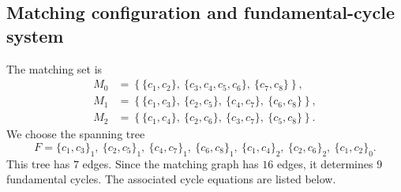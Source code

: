 \documentclass[11pt]{article}
\begin{document}
\subsection{Matching configuration and fundamental-cycle system}
The matching set is
\[
\begin{aligned}
M_0&=\left\{\{c_{1},c_{2}\},\ \{c_{3},c_{4},c_{5},c_{6}\},\ \{c_{7},c_{8}\}\right\},\\
M_1&=\left\{\{c_{1},c_{3}\},\ \{c_{2},c_{5}\},\ \{c_{4},c_{7}\},\ \{c_{6},c_{8}\}\right\},\\
M_2&=\left\{\{c_{1},c_{4}\},\ \{c_{2},c_{6}\},\ \{c_{3},c_{7}\},\ \{c_{5},c_{8}\}\right\}.
\end{aligned}
\]
We choose the spanning tree
\[
F={\{c_{1},c_{3}\}_{1},\ \{c_{2},c_{5}\}_{1},\ \{c_{4},c_{7}\}_{1},\ \{c_{6},c_{8}\}_{1},\ \{c_{1},c_{4}\}_{2},\ \{c_{2},c_{6}\}_{2},\ \{c_{1},c_{2}\}_{0}}.
\]
This tree has $7$ edges.  Since the matching graph has $16$ edges, it determines $9$ fundamental cycles.  The associated cycle equations are listed below.
\end{document}
